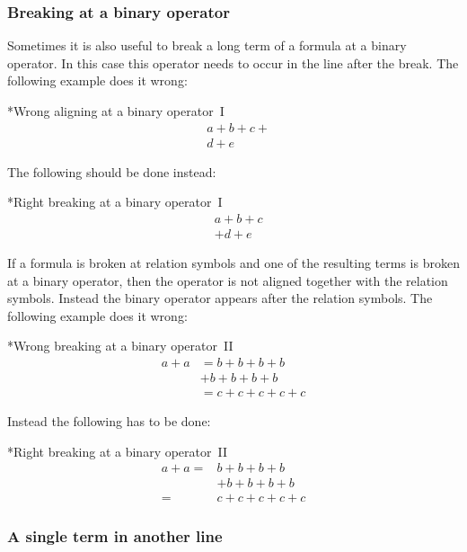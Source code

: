 \subsubsection{Breaking at a binary operator}

Sometimes it is also useful to break a long term of a formula at a binary operator.
In this case this operator needs to occur in the line after the break.
The following example does it wrong:
\begin{showlatex}*{Wrong aligning at a binary operator~I}
\begin{align*}
  & a + b + c + \\
  & d + e
\end{align*}
\end{showlatex}
The following should be done instead:
\begin{showlatex}*{Right breaking at a binary operator~I}
\begin{align*}
  & a + b + c \\
  & + d + e
\end{align*}
\end{showlatex}
If a formula is broken at relation symbols and one of the resulting terms is broken at a binary operator, then the operator is not aligned together with the relation symbols.
Instead the binary operator appears after the relation symbols.
The following example does it wrong:
\begin{showlatex}*{Wrong breaking at a binary operator~II}
\begin{align*}
  a + a
  &=
  b + b + b + b
  \\
  &+
  b + b + b + b
  \\
  &=
  c + c + c + c + c
\end{align*}
\end{showlatex}
Instead the following has to be done:
\begin{showlatex}*{Right breaking at a binary operator~II}
\begin{align*}
  a + a
  ={}&
  b + b + b + b
  \\
  {}&
  +b + b + b + b
  \\
  ={}&
  c + c + c + c + c
\end{align*}
\end{showlatex}

\subsubsection{A single term in another line}

